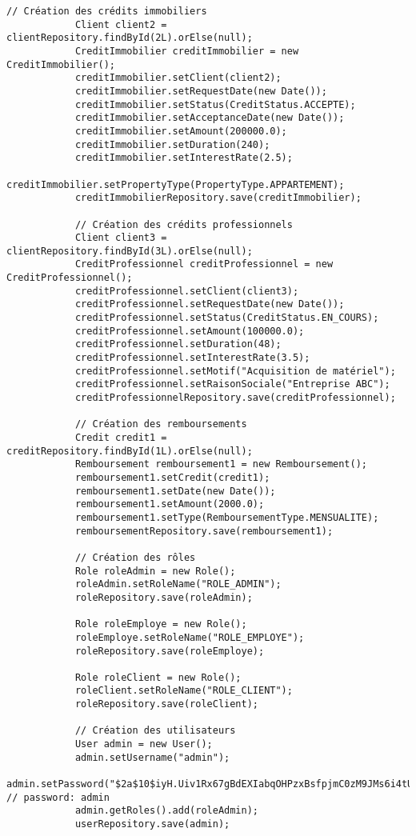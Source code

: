 \begin{lstlisting}[caption=Application de test de la couche DAO]
            // Création des crédits immobiliers
            Client client2 = clientRepository.findById(2L).orElse(null);
            CreditImmobilier creditImmobilier = new CreditImmobilier();
            creditImmobilier.setClient(client2);
            creditImmobilier.setRequestDate(new Date());
            creditImmobilier.setStatus(CreditStatus.ACCEPTE);
            creditImmobilier.setAcceptanceDate(new Date());
            creditImmobilier.setAmount(200000.0);
            creditImmobilier.setDuration(240);
            creditImmobilier.setInterestRate(2.5);
            creditImmobilier.setPropertyType(PropertyType.APPARTEMENT);
            creditImmobilierRepository.save(creditImmobilier);

            // Création des crédits professionnels
            Client client3 = clientRepository.findById(3L).orElse(null);
            CreditProfessionnel creditProfessionnel = new CreditProfessionnel();
            creditProfessionnel.setClient(client3);
            creditProfessionnel.setRequestDate(new Date());
            creditProfessionnel.setStatus(CreditStatus.EN_COURS);
            creditProfessionnel.setAmount(100000.0);
            creditProfessionnel.setDuration(48);
            creditProfessionnel.setInterestRate(3.5);
            creditProfessionnel.setMotif("Acquisition de matériel");
            creditProfessionnel.setRaisonSociale("Entreprise ABC");
            creditProfessionnelRepository.save(creditProfessionnel);

            // Création des remboursements
            Credit credit1 = creditRepository.findById(1L).orElse(null);
            Remboursement remboursement1 = new Remboursement();
            remboursement1.setCredit(credit1);
            remboursement1.setDate(new Date());
            remboursement1.setAmount(2000.0);
            remboursement1.setType(RemboursementType.MENSUALITE);
            remboursementRepository.save(remboursement1);

            // Création des rôles
            Role roleAdmin = new Role();
            roleAdmin.setRoleName("ROLE_ADMIN");
            roleRepository.save(roleAdmin);

            Role roleEmploye = new Role();
            roleEmploye.setRoleName("ROLE_EMPLOYE");
            roleRepository.save(roleEmploye);

            Role roleClient = new Role();
            roleClient.setRoleName("ROLE_CLIENT");
            roleRepository.save(roleClient);

            // Création des utilisateurs
            User admin = new User();
            admin.setUsername("admin");
            admin.setPassword("$2a$10$iyH.Uiv1Rx67gBdEXIabqOHPzxBsfpjmC0zM9JMs6i4tU0ymvZZie"); // password: admin
            admin.getRoles().add(roleAdmin);
            userRepository.save(admin);


\end{lstlisting}
